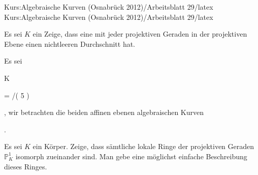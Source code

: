 Kurs:Algebraische Kurven (Osnabrück 2012)/Arbeitsblatt 29/latex
Kurs:Algebraische Kurven (Osnabrück 2012)/Arbeitsblatt 29/latex


\setcounter{section}{29}





{}

{


Es sei $K$ ein
Zeige, dass eine
mit jeder projektiven Geraden in der projektiven Ebene einen nichtleeren Durchschnitt hat.


}

{} {}



{}

{


Es sei


\mavergleichskette

{\vergleichskette

{ K
}

{ = }{ \Z/( 5 )
}

{  }{
}

{    }{
}

{   }{
}

}
{}{}{,}
wir betrachten die beiden affinen ebenen algebraischen Kurven


 { . }




}

{} {}



{}

{


Es sei $K$ ein Körper. Zeige, dass sämtliche lokale Ringe der projektiven Geraden ${\mathbb P}^{1}_{K}$ isomorph zueinander sind. Man gebe eine möglichst einfache Beschreibung dieses Ringes.


}

